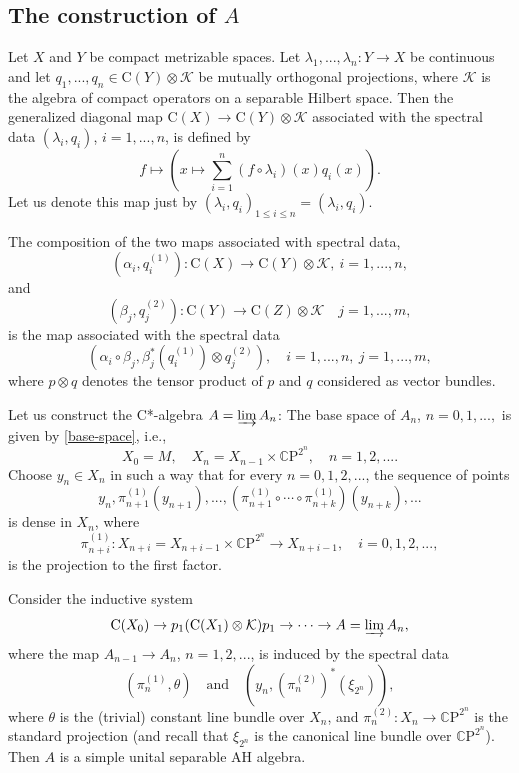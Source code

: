 \documentclass[12pt, oneside, psamsfonts]{amsart}
\theoremstyle{definition}
\theoremstyle{remark}
\numberwithin{equation}{section}
\newcommand{\Comp}{\mathbb C}
\begin{document}
\subsection{The construction of $A$}
Let $X$ and $Y$ be compact metrizable spaces. Let $\lambda_1, ..., \lambda_n: Y \to X$ be continuous and let $q_1, ..., q_n \in \mathrm{C}(Y)\otimes \mathcal K$ be mutually orthogonal projections, where $\mathcal K$ is the algebra of compact operators on a separable Hilbert space. Then the generalized diagonal map $\mathrm{C}(X) \to \mathrm C(Y) \otimes \mathcal K$ associated with the spectral data $(\lambda_i, q_i)$, $i=1, ..., n$, is defined by
$$ f \mapsto (x \mapsto \sum_{i=1}^n (f \circ \lambda_i)(x)q_i(x)).$$ Let us denote this map just by $(\lambda_i, q_i)_{1\leq i\leq n} = (\lambda_i, q_i)$.


The composition of the two maps associated with spectral data,  $$(\alpha_i, q^{(1)}_i): \mathrm{C}(X) \to \mathrm C(Y) \otimes \mathcal K,\ i=1, ..., n,$$ and 
$$(\beta_j, q^{(2)}_j): \mathrm{C}(Y) \to \mathrm C(Z) \otimes \mathcal K \quad j=1, ..., m, $$ is the map associated with the spectral data $$(\alpha_i\circ\beta_j, \beta_j^*(q^{(1)}_i) \otimes q^{(2)}_j),\quad i=1, ..., n,\ j=1, ..., m,$$ where $p\otimes q$ denotes the tensor product of $p$ and $q$ considered as vector bundles.

Let us construct the C*-algebra $A = \varinjlim A_n$: The base space of $A_n$, $n = 0, 1, ...,$ is given by \eqref{base-space}, i.e., 
$$X_0 = M, \quad X_{n} = X_{n-1} \times \mathbb C\mathrm{P}^{2^{n}}, \quad n=1, 2, ....$$ 
Choose $y_n \in X_{n}$ in such a way that for every $n=0, 1, 2, ...$, the sequence of points   
$$y_n, \pi_{n+1}^{(1)}(y_{n+1}), ..., (\pi_{n+1}^{(1)} \circ\cdots\circ \pi_{n+k}^{(1)})(y_{n+k}), ...$$
is dense in $X_n$, where $$\pi_{n+i}^{(1)}: X_{n+i} = X_{n+i - 1} \times \Comp\mathrm P^{2^n} \to X_{n+i-1},\quad i=0, 1, 2, ...,$$ is the projection to the first factor.

Consider the inductive system 
$$
\mathrm{C}(X_0) \to p_1 (\mathrm{C}(X_1) \otimes \mathcal K) p_1 \to \cdots \to  A = \varinjlim A_n, 
$$
where the map $A_{n-1} \to A_{n}$, $n=1, 2, ...$, is induced by the spectral data 
$$(\pi^{(1)}_{n}, \theta)\quad \mathrm{and}\quad (y_{n}, (\pi^{(2)}_{n})^*(\xi_{2^{n}})),$$
where $\theta$ is the (trivial) constant line bundle over $X_n$, and $\pi_n^{(2)}: X_n \to \Comp\mathrm P^{2^n}$ is the standard projection (and recall that $\xi_{2^n}$ is the canonical line bundle over $\Comp \mathrm P^{2^n}$). Then $A$ is a simple unital separable AH algebra.
\end{document}
